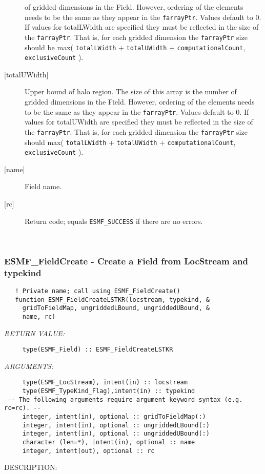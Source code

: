 \begin{description}
   of gridded dimensions in the Field. However, ordering of the elements 
   needs to be the same as they appear in the {\tt farrayPtr}. Values default 
   to 0. If values for totalLWidth are specified they must be reflected in 
   the size of the {\tt farrayPtr}. That is, for each gridded dimension the 
   {\tt farrayPtr} size should be max( {\tt totalLWidth} + {\tt totalUWidth} 
   + {\tt computationalCount}, {\tt exclusiveCount} ). 
   \item [{[totalUWidth]}] 
   Upper bound of halo region. The size of this array is the number 
   of gridded dimensions in the Field. However, ordering of the elements 
   needs to be the same as they appear in the {\tt farrayPtr}. Values default 
   to 0. If values for totalUWidth are specified they must be reflected in 
   the size of the {\tt farrayPtr}. That is, for each gridded dimension the 
   {\tt farrayPtr} size should max( {\tt totalLWidth} + {\tt totalUWidth} 
   + {\tt computationalCount}, {\tt exclusiveCount} ). 
   \item [{[name]}] 
   Field name. 
   \item [{[rc]}] 
   Return code; equals {\tt ESMF\_SUCCESS} if there are no errors. 
   \end{description} 
    
 
\mbox{}\hrulefill\ 
 
\subsubsection [ESMF\_FieldCreate] {ESMF\_FieldCreate - Create a Field from LocStream and typekind}


\begin{verbatim}   ! Private name; call using ESMF_FieldCreate()
   function ESMF_FieldCreateLSTKR(locstream, typekind, &
     gridToFieldMap, ungriddedLBound, ungriddedUBound, &
     name, rc)\end{verbatim}{\em RETURN VALUE:}
\begin{verbatim}     type(ESMF_Field) :: ESMF_FieldCreateLSTKR\end{verbatim}{\em ARGUMENTS:}
\begin{verbatim}     type(ESMF_LocStream), intent(in) :: locstream
     type(ESMF_TypeKind_Flag),intent(in) :: typekind
 -- The following arguments require argument keyword syntax (e.g. rc=rc). --
     integer, intent(in), optional :: gridToFieldMap(:)
     integer, intent(in), optional :: ungriddedLBound(:)
     integer, intent(in), optional :: ungriddedUBound(:)
     character (len=*), intent(in), optional :: name
     integer, intent(out), optional :: rc\end{verbatim}
{\sf DESCRIPTION:\\ }


